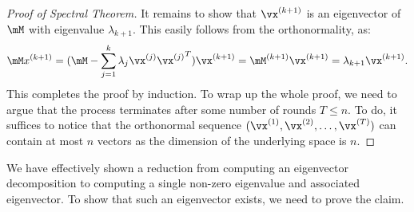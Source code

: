 \begin{proof}[Proof of Spectral Theorem]
It remains to show that $\vx^{(k+1)}$ is an eigenvector of $\mM$ with eigenvalue $\lambda_{k+1}$. This easily follows from the orthonormality, as:
$$
\mM x^{(k+1)} = (\mM - \sum_{j=1}^k \lambda_j \vx^{(j)} {\vx^{(j)}}^T) \vx^{(k+1)} = \mM^{(k+1)} \vx^{(k+1)} = \lambda_{k+1} \vx^{(k+1)}.
$$
This completes the proof by induction. To wrap up the whole proof, we need to argue that the process terminates after some number of rounds $T \leq n.$ To do, it suffices to notice that the orthonormal sequence $(\vx^{(1)}, \vx^{(2)}, \ldots, \vx^{(T)})$ can contain at most $n$ vectors as the dimension of the underlying space is $n.$
\end{proof}

We have effectively shown a reduction from computing an eigenvector decomposition to computing a single non-zero eigenvalue and associated eigenvector. To show that such an eigenvector exists, we need to prove the claim. 


